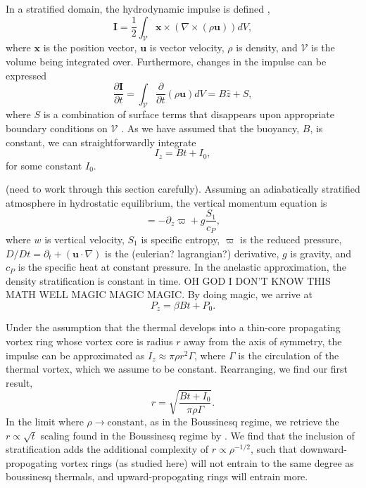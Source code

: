 \documentclass[twocolumn, amsmath, amsfonts, amssymb, trackchanges]{aastex62}
\newcommand{\grad}{\ensuremath{\nabla}}
\begin{document}
In a stratified domain, the hydrodynamic impulse is defined
\citet{shivamoggi2010},
\begin{equation}
\bm{I} = \frac{1}{2}\int_{\mathcal{V}} \bm{x}\times(\grad\times(\rho\bm{u}))dV,
\end{equation}
where $\bm{x}$ is the position vector, $\bm{u}$ is vector velocity, $\rho$ is density,
and $\mathcal{V}$ is the volume being integrated over. Furthermore, changes in the impulse
can be expressed
\begin{equation}
\frac{\partial\bm{I}}{\partial t} = \int_{\mathcal{V}}\frac{\partial}{\partial t}(\rho \bm{u})dV
= B\hat{z} + S,
\end{equation}
where $S$ is a combination of surface terms that disappears upon appropriate boundary conditions
on $\mathcal{V}$ \citep{shivamoggi2010}. As we have assumed that the buoyancy, $B$, is constant,
we can straightforwardly integrate
\begin{equation}
I_z = B t + I_0,
\end{equation}
for some constant $I_0$.

(need to work through this section carefully).
Assuming an adiabatically stratified atmosphere in
hydrostatic equilibrium, the vertical momentum equation is
\begin{equation}
 = - \partial_z \varpi +  g\frac{S_1}{c_P},
\label{eqn:buoyancy}
\end{equation}
where $w$ is vertical velocity, $S_1$ is specific entropy, $\varpi$ is the reduced pressure,
$D/Dt = \partial_t + (\bm{u}\cdot\grad)$ is the (eulerian? lagrangian?)
derivative, $g$ is gravity, and $c_P$ is the specific heat at constant pressure.
In the anelastic approximation, the density stratification is constant in time. 
OH GOD I DON'T KNOW THIS MATH WELL MAGIC MAGIC MAGIC.
By doing magic, we arrive at
\begin{equation}
P_z = \beta B t + P_0.
\end{equation}

Under the assumption that the thermal develops into a thin-core 
propagating vortex ring whose vortex core is radius $r$ away from the axis of symmetry, 
the impulse can be approximated as $I_z \approx \pi \rho r^2 \Gamma$, where 
$\Gamma$ is the circulation of the thermal vortex, which we assume to be constant. 
Rearranging, we find our first result,
\begin{equation}
r = \sqrt{\frac{B t + I_0}{\pi\rho\Gamma}}.
\label{eqn:r_theory}
\end{equation}
In the limit where $\rho \rightarrow \text{constant}$, as in the Boussinesq regime,
we retrieve the $r \propto \sqrt{t}$ scaling found in the Boussinesq regime by
\citet{lecoanet&jeevanjee2018}. We find that the inclusion of stratification adds the
additional complexity of $r \propto \rho^{-1/2}$, such that downward-propogating 
vortex rings (as studied here) will not entrain to the same degree as boussinesq thermals,
and upward-propogating rings will entrain more.
\end{document}
